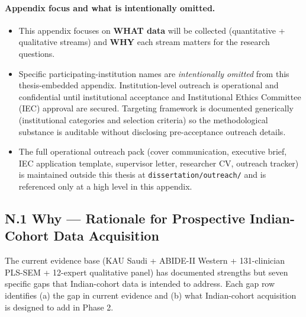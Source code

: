\paragraph{Appendix focus and what is intentionally omitted.}
\begin{itemize}[leftmargin=*, itemsep=2pt]
    \item This appendix focuses on \textbf{WHAT data} will be collected (quantitative + qualitative streams) and \textbf{WHY} each stream matters for the research questions.
    \item Specific participating-institution names are \emph{intentionally omitted} from this thesis-embedded appendix. Institution-level outreach is operational and confidential until institutional acceptance and Institutional Ethics Committee (IEC) approval are secured. Targeting framework is documented generically (institutional categories and selection criteria) so the methodological substance is auditable without disclosing pre-acceptance outreach details.
    \item The full operational outreach pack (cover communication, executive brief, IEC application template, supervisor letter, researcher CV, outreach tracker) is maintained outside this thesis at \texttt{dissertation/outreach/} and is referenced only at a high level in this appendix.
\end{itemize}

\subsection*{N.1 Why --- Rationale for Prospective Indian-Cohort Data Acquisition}
\label{sec:appendix_n_rationale}

\noindent The current evidence base (KAU Saudi + ABIDE-II Western + 131-clinician PLS-SEM + 12-expert qualitative panel) has documented strengths but seven specific gaps that Indian-cohort data is intended to address. Each gap row identifies (a) the gap in current evidence and (b) what Indian-cohort acquisition is designed to add in Phase 2.

